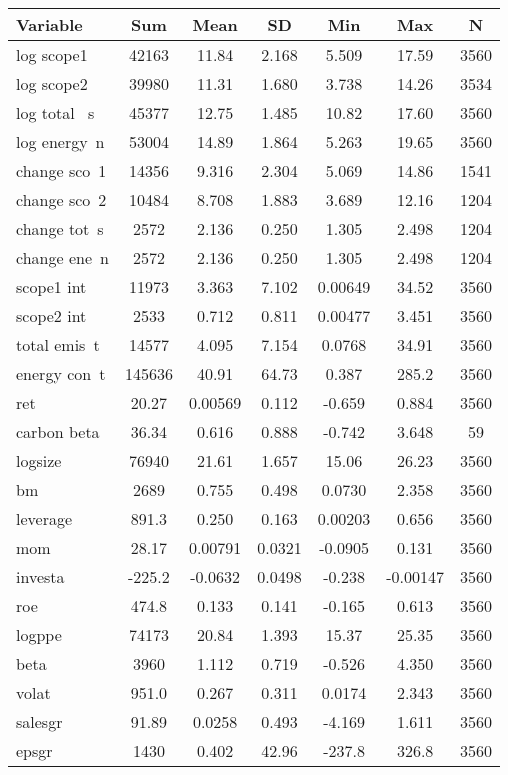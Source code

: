\documentclass[]{article}
\begin{document}
\begin{tabular}{lcccccc} \hline
Variable & Sum & Mean & SD & Min & Max & N \\ \hline
log scope1 & 42163 & 11.84 & 2.168 & 5.509 & 17.59 & 3560 \\
log scope2 & 39980 & 11.31 & 1.680 & 3.738 & 14.26 & 3534 \\
log total ~s & 45377 & 12.75 & 1.485 & 10.82 & 17.60 & 3560 \\
log energy~n & 53004 & 14.89 & 1.864 & 5.263 & 19.65 & 3560 \\
change sco~1 & 14356 & 9.316 & 2.304 & 5.069 & 14.86 & 1541 \\
change sco~2 & 10484 & 8.708 & 1.883 & 3.689 & 12.16 & 1204 \\
change tot~s & 2572 & 2.136 & 0.250 & 1.305 & 2.498 & 1204 \\
change ene~n & 2572 & 2.136 & 0.250 & 1.305 & 2.498 & 1204 \\
scope1 int & 11973 & 3.363 & 7.102 & 0.00649 & 34.52 & 3560 \\
scope2 int & 2533 & 0.712 & 0.811 & 0.00477 & 3.451 & 3560 \\
total emis~t & 14577 & 4.095 & 7.154 & 0.0768 & 34.91 & 3560 \\
energy con~t & 145636 & 40.91 & 64.73 & 0.387 & 285.2 & 3560 \\
ret & 20.27 & 0.00569 & 0.112 & -0.659 & 0.884 & 3560 \\
carbon beta & 36.34 & 0.616 & 0.888 & -0.742 & 3.648 & 59 \\
logsize & 76940 & 21.61 & 1.657 & 15.06 & 26.23 & 3560 \\
bm & 2689 & 0.755 & 0.498 & 0.0730 & 2.358 & 3560 \\
leverage & 891.3 & 0.250 & 0.163 & 0.00203 & 0.656 & 3560 \\
mom & 28.17 & 0.00791 & 0.0321 & -0.0905 & 0.131 & 3560 \\
investa & -225.2 & -0.0632 & 0.0498 & -0.238 & -0.00147 & 3560 \\
roe & 474.8 & 0.133 & 0.141 & -0.165 & 0.613 & 3560 \\
logppe & 74173 & 20.84 & 1.393 & 15.37 & 25.35 & 3560 \\
beta & 3960 & 1.112 & 0.719 & -0.526 & 4.350 & 3560 \\
volat & 951.0 & 0.267 & 0.311 & 0.0174 & 2.343 & 3560 \\
salesgr & 91.89 & 0.0258 & 0.493 & -4.169 & 1.611 & 3560 \\
 epsgr & 1430 & 0.402 & 42.96 & -237.8 & 326.8 & 3560 \\ \hline
\end{tabular}
\end{document}
